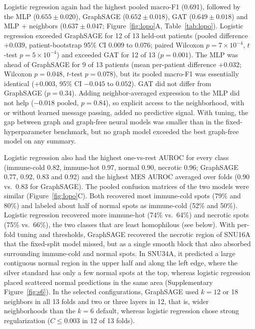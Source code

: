 \documentclass[11pt,letterpaper]{article}
\begin{document}
Logistic regression again had the highest pooled macro-F1 (0.691), followed by the MLP ($0.655 \pm 0.020$), GraphSAGE ($0.652 \pm 0.018$), GAT ($0.649 \pm 0.018$) and MLP + neighbors ($0.637 \pm 0.047$; Figure~\ref{fig:lopo}A, Table~\ref{tab:lopo}). Logistic regression exceeded GraphSAGE for 12 of 13 held-out patients (pooled difference $+0.039$, patient-bootstrap 95\% CI $0.009$ to $0.076$; paired Wilcoxon $p = 7 \times 10^{-4}$, $t$-test $p = 5 \times 10^{-4}$) and exceeded GAT for 12 of 13 ($p = 0.001$). The MLP was ahead of GraphSAGE for 9 of 13 patients (mean per-patient difference $+0.032$; Wilcoxon $p = 0.048$, $t$-test $p = 0.078$), but its pooled macro-F1 was essentially identical ($+0.003$, 95\% CI $-0.045$ to $0.052$). GAT did not differ from GraphSAGE ($p = 0.34$). Adding neighbor-averaged expression to the MLP did not help ($-0.018$ pooled, $p = 0.84$), so explicit access to the neighborhood, with or without learned message passing, added no predictive signal. With tuning, the gap between graph and graph-free neural models was smaller than in the fixed-hyperparameter benchmark, but no graph model exceeded the best graph-free model on any summary.

Logistic regression also had the highest one-vs-rest AUROC for every class (immune-cold 0.82, immune-hot 0.97, normal 0.90, necrotic 0.96; GraphSAGE 0.77, 0.92, 0.83 and 0.92) and the highest MES AUROC averaged over folds (0.90 vs.\ 0.83 for GraphSAGE). The pooled confusion matrices of the two models were similar (Figure~\ref{fig:lopo}C). Both recovered most immune-cold spots (79\% and 80\%) and labeled about half of normal spots as immune-cold (52\% and 50\%). Logistic regression recovered more immune-hot (74\% vs.\ 64\%) and necrotic spots (75\% vs.\ 66\%), the two classes that are least homophilous (see below). With per-fold tuning and thresholds, GraphSAGE recovered the necrotic region of SNU16A that the fixed-split model missed, but as a single smooth block that also absorbed surrounding immune-cold and normal spots. In SNU34A, it predicted a large contiguous normal region in the upper half and along the left edge, where the silver standard has only a few normal spots at the top, whereas logistic regression placed scattered normal predictions in the same area (Supplementary Figure~\ref{fig:s6}). In the selected configurations, GraphSAGE used $k = 12$ or 18 neighbors in all 13 folds and two or three layers in 12, that is, wider neighborhoods than the $k = 6$ default, whereas logistic regression chose strong regularization ($C \le 0.003$ in 12 of 13 folds).
\end{document}
